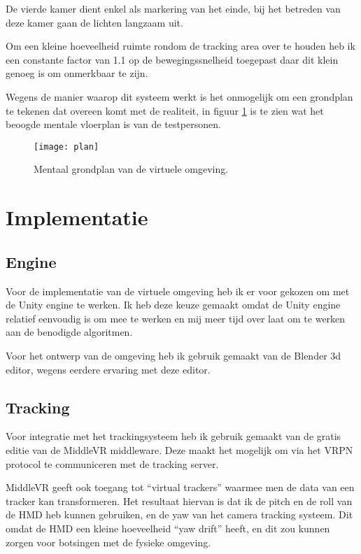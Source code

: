 De vierde kamer dient enkel als markering van het einde, bij het betreden van
deze kamer gaan de lichten langzaam uit.

Om een kleine hoeveelheid ruimte rondom de tracking area over te houden heb ik
een constante factor van 1.1 op de bewegingssnelheid toegepast daar dit klein 
genoeg is om onmerkbaar te zijn\cite{steinicke09}.

Wegens de manier waarop dit systeem werkt is het onmogelijk om een grondplan te
tekenen dat overeen komt met de realiteit, in figuur \ref{fig:plan} is te zien
wat het beoogde mentale vloerplan is van de testpersonen.

\begin{figure}[p]
    \centering
    \texttt{[image: plan]}
    \caption{Mentaal grondplan van de virtuele omgeving.}
    \label{fig:plan}
\end{figure}


\section{Implementatie}
\subsection{Engine}
Voor de implementatie van de virtuele omgeving heb ik er voor gekozen om met de
Unity engine te werken. Ik heb deze keuze gemaakt omdat de Unity engine relatief
eenvoudig is om mee te werken en mij meer tijd over laat om te werken aan de
benodigde algoritmen.

Voor het ontwerp van de omgeving heb ik gebruik gemaakt van de Blender 3d
editor, wegens eerdere ervaring met deze editor.

\subsection{Tracking}
Voor integratie met het trackingsysteem heb ik gebruik gemaakt van de gratis
editie van de MiddleVR middleware. Deze maakt het mogelijk om via het VRPN
protocol te communiceren met de tracking server.

MiddleVR geeft ook toegang tot ``virtual trackers'' waarmee men de data van een
tracker kan transformeren. Het resultaat hiervan is dat ik de pitch en de roll
van de HMD heb kunnen gebruiken, en de yaw van het camera tracking systeem. Dit
omdat de HMD een kleine hoeveelheid ``yaw drift'' heeft, en dit zou kunnen zorgen
voor botsingen met de fysieke omgeving.

